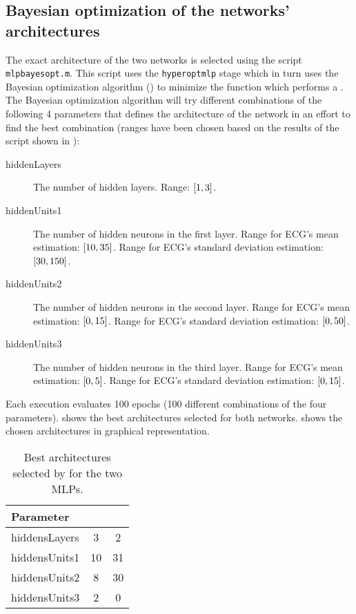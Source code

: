 

\subsection{Bayesian optimization of the networks'
architectures}\label{subsec:mlpbayesopt}

The exact architecture of the two networks is selected using the script
\texttt{mlpbayesopt.m}. This script uses the \texttt{hyperoptmlp} stage which
in turn uses the Bayesian optimization algorithm () to minimize
the  function which performs a . The Bayesian optimization algorithm will try different
combinations of the following 4 parameters that defines the architecture of the
network in an effort to find the best combination (ranges have been chosen
based on the results of the  script shown in
):
\begin{description}
\item[hiddenLayers] The number of hidden layers. Range:
	\(\interval{1}{3}\).
\item[hiddenUnits1] The number of hidden neurons in the first layer. Range for
	ECG's mean estimation: \(\interval{10}{35}\). Range for ECG's standard
	deviation estimation: \(\interval{30}{150}\).
\item[hiddenUnits2] The number of hidden neurons in the second layer. Range for
	ECG's mean estimation: \(\interval{0}{15}\). Range for ECG's standard
	deviation estimation: \(\interval{0}{50}\).
\item[hiddenUnits3] The number of hidden neurons in the third layer. Range for
	ECG's mean estimation: \(\interval{0}{5}\). Range for ECG's standard
	deviation estimation: \(\interval{0}{15}\).
\end{description}

Each  execution evaluates 100 epochs (100 different combinations
of the four parameters).  shows the best
architectures selected for both networks.  shows the
chosen architectures in graphical representation.

\begin{table}[hbtp]
	\centering
	\begin{tabular}{|l|c|c|}
		\toprule
		Parameter & \standout{ECG mean} & \standout{ECG stddev} \\
		\midrule
		hiddensLayers & 3 & 2 \\
		hiddensUnits1 & 10 & 31 \\
		hiddensUnits2 & 8 & 30 \\
		hiddensUnits3 & 2 & 0 \\
		\bottomrule
	\end{tabular}
	\caption{Best architectures selected by  for the two
	MLPs.}\label{table:mlpbayesopt}
\end{table}

